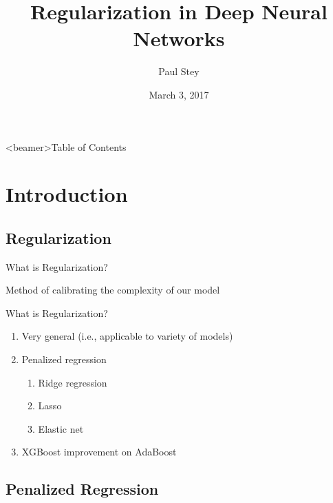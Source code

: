 \documentclass[pdf]{beamer}
\title[Regularization]{Regularization in Deep Neural Networks}
\author{Paul Stey}
\date{March 3, 2017}
\begin{document}
\begin{frame}
\titlepage
\end{frame}



\begin{frame}<beamer>{Table of Contents}
	\tableofcontents[currentsection, 
				 currentsubsection, 
				 sectionstyle=show, 
				 subsectionstyle=show]
\end{frame}


\section{Introduction}
	\subsection{Regularization}
		\begin{frame}{What is Regularization?}
			\begin{center}
				Method of calibrating the complexity of our model  
			\end{center}
			
		\end{frame}
		
		
		\begin{frame}{What is Regularization?}
			\begin{enumerate}
				
				\item Very general (i.e., applicable to variety of models)
				\item Penalized regression
					\begin{enumerate} [1]
						\item Ridge regression
						\item Lasso 
						\item Elastic net
					\end{enumerate}
				\item XGBoost improvement on AdaBoost 
			\end{enumerate}
		\end{frame}	
	
		
		
	\subsection{Penalized Regression}
				
\end{document}
